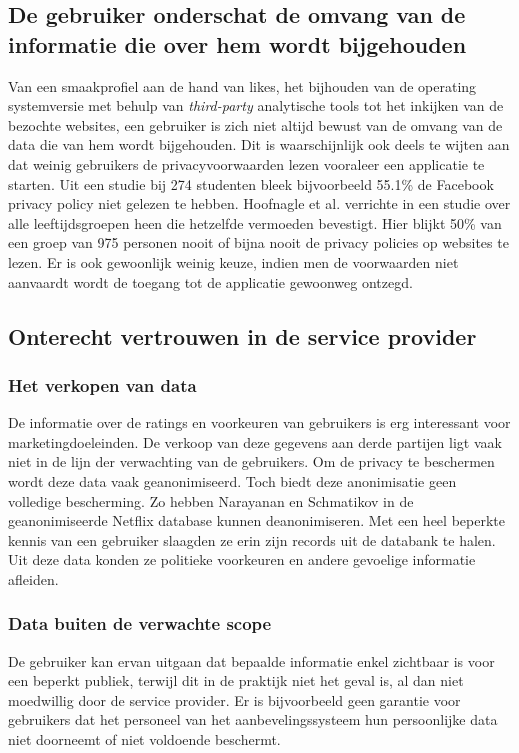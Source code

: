 \subsection{De gebruiker onderschat de omvang van de informatie die over hem wordt bijgehouden}
Van een smaakprofiel aan de hand van likes, het bijhouden van de operating systemversie met behulp van \emph{third-party} analytische tools tot het inkijken van de bezochte websites, een gebruiker is zich niet altijd bewust van de omvang van de data die van hem wordt bijgehouden\cite{pirs}. Dit is waarschijnlijk ook deels te wijten aan dat weinig gebruikers de privacyvoorwaarden lezen vooraleer een applicatie te starten. Uit een studie \cite{privdisc} bij 274 studenten bleek bijvoorbeeld 55.1\% de Facebook privacy policy niet gelezen te hebben. Hoofnagle et al. verrichte in \cite{hoofnagle} een studie over alle leeftijdsgroepen heen die hetzelfde vermoeden bevestigt. Hier blijkt  50\% van een groep van 975 personen nooit of bijna nooit de privacy policies op websites te lezen. Er is ook gewoonlijk weinig keuze, indien men de voorwaarden niet aanvaardt wordt de toegang tot de applicatie gewoonweg ontzegd. 
\subsection{Onterecht vertrouwen in de service provider}
\label{onterecht_vertrouwen}
\subsubsection{Het verkopen van data}
De informatie over de ratings en voorkeuren van gebruikers is erg interessant voor marketingdoeleinden. De verkoop van deze gegevens aan derde partijen ligt vaak niet in de lijn der verwachting van de gebruikers. Om de privacy te beschermen wordt deze data vaak geanonimiseerd. Toch biedt deze anonimisatie geen volledige bescherming. Zo hebben Narayanan en Schmatikov in \cite{Narayanan2008} de geanonimiseerde Netflix database kunnen deanonimiseren. Met een heel beperkte kennis van een gebruiker slaagden ze erin zijn records uit de databank te halen. Uit deze data konden ze politieke voorkeuren en andere gevoelige informatie afleiden.
\subsubsection{Data buiten de verwachte scope \cite{pirs}}
De gebruiker kan ervan uitgaan dat bepaalde informatie enkel zichtbaar is voor een beperkt publiek, terwijl dit in de praktijk niet het geval is, al dan niet moedwillig door de service provider. Er is bijvoorbeeld geen garantie voor gebruikers dat het personeel van het aanbevelingssysteem hun persoonlijke data niet doorneemt of niet voldoende beschermt.\\

